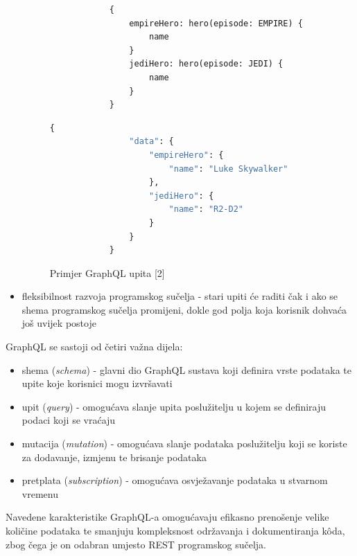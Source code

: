 \documentclass[zavrsnirad]{fer}
\begin{document}
\begin{itemize}
 	\begin{figure}[htb]
 		\centering
 		 	\begin{lstlisting}
 			{
 				empireHero: hero(episode: EMPIRE) {
 					name
 				}
 				jediHero: hero(episode: JEDI) {
 					name
 				}
 			}
 		\end{lstlisting}
 		\begin{lstlisting}[language=GraphQL]
 			{
 				"data": {
 					"empireHero": {
 						"name": "Luke Skywalker"
 					},
 					"jediHero": {
 						"name": "R2-D2"
 					}
 				}
 			}
 		\end{lstlisting}
 		\caption{Primjer GraphQL upita [2]}
 	\end{figure}
 	\FloatBarrier
 	
  	\item {fleksibilnost razvoja programskog sučelja} - stari upiti će raditi čak i ako se shema programskog sučelja promijeni, dokle god polja koja korisnik dohvaća još uvijek postoje
 \end{itemize}
GraphQL se sastoji od četiri važna dijela:
\begin{itemize}
	\item shema (\textit{schema}) - glavni dio GraphQL sustava koji definira vrste podataka te upite koje korisnici mogu izvršavati
	\item upit (\textit{query}) - omogućava slanje upita poslužitelju u kojem se definiraju podaci koji se vraćaju
	\item mutacija (\textit{mutation}) - omogućava slanje podataka poslužitelju koji se koriste za dodavanje, izmjenu te brisanje podataka
	\item pretplata (\textit{subscription}) - omogućava osvježavanje podataka u stvarnom vremenu
\end{itemize}
Navedene karakteristike GraphQL-a omogućavaju efikasno prenošenje velike količine podataka te smanjuju kompleksnost održavanja i dokumentiranja kôda, zbog čega je on odabran umjesto REST programskog sučelja.
\end{document}
